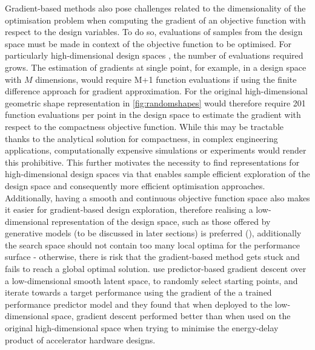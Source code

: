 \documentclass{article}
\begin{document}
Gradient-based methods also pose challenges related to the dimensionality of the optimisation problem when computing the gradient of an objective function with respect to the design variables. To do so, evaluations of samples from the design space must be made in context of the objective function to be optimised. For particularly high-dimensional design spaces \citep{Serani2024}, the number of evaluations required grows. The estimation of gradients at single point, for example, in a design space with $M$ dimensions, would require M+1 function evaluations if using the finite difference approach for gradient approximation. For the original high-dimensional geometric shape representation in \ref{fig:randomshapes} would therefore require 201 function evaluations per point in the design space to estimate the gradient with respect to the compactness objective function. While this may be tractable thanks to the analytical solution for compactness, in complex engineering applications, computationally expensive simulations or experiments would render this prohibitive. This further motivates the necessity to find representations for high-dimensional design spaces via that enables  sample efficient exploration of the design space and consequently more efficient optimisation approaches. Additionally, having a smooth and continuous objective function space also makes it easier for gradient-based design exploration, therefore realising a low-dimensional representation of the design space, such as those offered by generative models (to be discussed in later sections) is preferred (\cite{bottou2010large}), additionally the search space should not contain too many local optima for the performance surface - otherwise, there is risk that the gradient-based method gets stuck and fails to reach a global optimal solution. \citep{Huang2022} use predictor-based gradient descent over a low-dimensional smooth latent space, to randomly select starting points, and iterate towards a target performance using the gradient of the a trained performance predictor model and they found that when deployed to the low-dimensional space, gradient descent performed better than when used on the original high-dimensional space when trying to minimise the energy-delay product of accelerator hardware designs.
\end{document}
